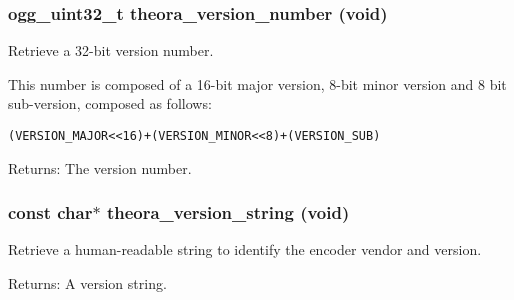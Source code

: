 \subsubsection{\setlength{\rightskip}{0pt plus 5cm}ogg\_\-uint32\_\-t theora\_\-version\_\-number (void)}\label{theora_8h_d9cec696a9c830e9b3cb1bf4e372b23d}


Retrieve a 32-bit version number. 

This number is composed of a 16-bit major version, 8-bit minor version and 8 bit sub-version, composed as follows: \small\begin{alltt}
   (VERSION\_MAJOR<<16) + (VERSION\_MINOR<<8) + (VERSION\_SUB)
\end{alltt}\normalsize 
 \begin{Desc}
\item[Returns:]The version number. \end{Desc}
\subsubsection{\setlength{\rightskip}{0pt plus 5cm}const char$\ast$ theora\_\-version\_\-string (void)}\label{theora_8h_7682deb3e6612db562f54ea66b95584b}


Retrieve a human-readable string to identify the encoder vendor and version. 

\begin{Desc}
\item[Returns:]A version string. \end{Desc}
